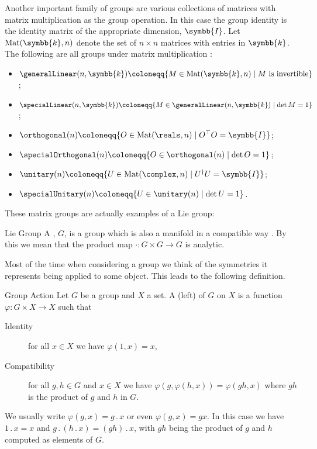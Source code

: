 \documentclass[fleqn]{NotesClass}
\newcommand{\identity}{1}
\newcommand{\identityMatrix}{\symbb{I}}
\renewcommand{\field}{\symbb{k}}
\newcommand{\trans}{\top}
\newcommand{\hermit}{\dagger}
\newcommand{\action}{\mathbin{.}}
\begin{document}
    Another important family of groups are various collections of matrices with matrix multiplication as the group operation.
    In this case the group identity is the identity matrix of  the appropriate dimension, \(\identityMatrix\).
    Let \(\matrices{n}{\field}\) denote the set of \(n \times n\) matrices with entries in \(\field\).
    The following are all groups under matrix multiplication \cite{allanach}:
    \begin{itemize}
        \item {} \(\generalLinear(n, \field) \coloneqq \{M \in \matrices{n}{\field} \mid M \text{ is invertible} \}\);
        \item {} \(\specialLinear(n, \field) \coloneqq \{M \in \generalLinear(n, \field) \mid \det M = 1\}\);
        \item {} \(\orthogonal(n) \coloneqq \{O \in \matrices{n}{\reals} \mid O^\trans O = \identityMatrix \}\);
        \item {} \(\specialOrthogonal(n) \coloneqq \{O \in \orthogonal(n) \mid \det O = 1\}\);
        \item {} \(\unitary(n) \coloneqq \{U \in \matrices{n}{\complex} \mid U^\hermit U = \identityMatrix \}\);
        \item {} \(\specialUnitary(n) \coloneqq \{U \in \unitary(n) \mid \det U = 1\}\).
    \end{itemize}
    These matrix groups are actually examples of a Lie group:
    \begin{dfn}{Lie Group}{}
        A , \(G\), is a group which is also a manifold in a compatible way \cite{san-martin-lie-groups}.
        By this we mean that the product map \(\cdot \colon G \times G \to G\) is analytic.
    \end{dfn}
    
    Most of the time when considering a group we think of the symmetries it represents being applied to some object.
    This leads to the following definition.
    
    \begin{dfn}{Group Action}{}
        Let \(G\) be a group and \(X\) a set.
        A (left)  of \(G\) on \(X\) is a function \(\varphi \colon G \times X \to X\) such that \cite[713]{hassani}
        \begin{description}
            \item[Identity] for all \(x \in X\) we have \(\varphi(\identity, x) = x\),
            \item[Compatibility] for all \(g, h \in G\) and \(x \in X\) we have \(\varphi(g, \varphi(h, x)) = \varphi(gh, x)\) where \(gh\) is the product of \(g\) and \(h\) in \(G\).
        \end{description}
        We usually write \(\varphi(g, x) = g \action x\) or even \(\varphi(g, x) = gx\).
        In this case we have \(\identity \action x = x\) and \(g \action (h \action x) = (gh) \action x\), with \(gh\) being the product of \(g\) and \(h\) computed as elements of \(G\).
    \end{dfn}
    
\end{document}
